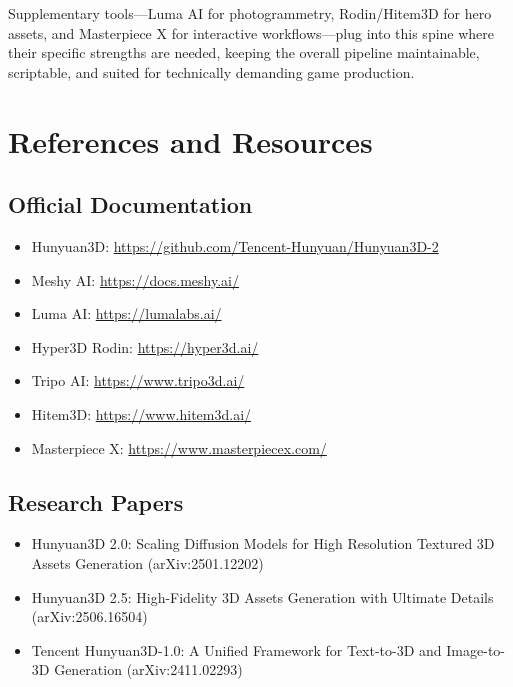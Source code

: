 \documentclass[11pt]{article}
\begin{document}
Supplementary tools---Luma AI for photogrammetry, Rodin/Hitem3D for hero assets, and Masterpiece X for interactive workflows---plug into this spine where their specific strengths are needed, keeping the overall pipeline maintainable, scriptable, and suited for technically demanding game production.

\newpage
\section*{References and Resources}

\subsection*{Official Documentation}

\begin{itemize}[leftmargin=2em]
  \item Hunyuan3D: \url{https://github.com/Tencent-Hunyuan/Hunyuan3D-2}
  \item Meshy AI: \url{https://docs.meshy.ai/}
  \item Luma AI: \url{https://lumalabs.ai/}
  \item Hyper3D Rodin: \url{https://hyper3d.ai/}
  \item Tripo AI: \url{https://www.tripo3d.ai/}
  \item Hitem3D: \url{https://www.hitem3d.ai/}
  \item Masterpiece X: \url{https://www.masterpiecex.com/}
\end{itemize}

\subsection*{Research Papers}

\begin{itemize}[leftmargin=2em]
  \item Hunyuan3D 2.0: Scaling Diffusion Models for High Resolution Textured 3D Assets Generation (arXiv:2501.12202)
  \item Hunyuan3D 2.5: High-Fidelity 3D Assets Generation with Ultimate Details (arXiv:2506.16504)
  \item Tencent Hunyuan3D-1.0: A Unified Framework for Text-to-3D and Image-to-3D Generation (arXiv:2411.02293)
\end{itemize}
\end{document}
